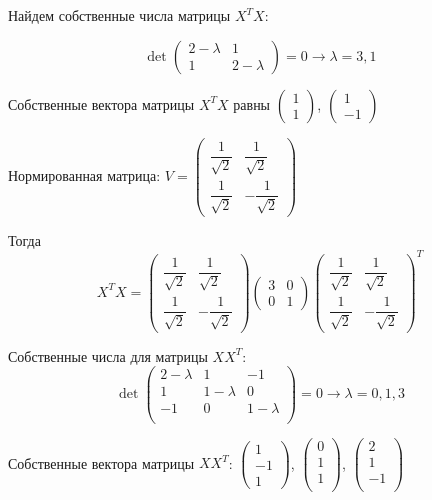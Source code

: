 \documentclass[12pt]{article} %
\theoremstyle{definition} %
\begin{document}
Найдем собственные числа матрицы $X^TX$:

\[
\det \begin{pmatrix}
2-\lambda & 1 \\
1 & 2-\lambda
\end{pmatrix}=0 \rightarrow \lambda = 3,1
\]

Собственные вектора матрицы $X^TX$ равны $\begin{pmatrix}
1 \\
1
\end{pmatrix}$, $\begin{pmatrix}
1 \\
-1
\end{pmatrix}$

Нормированная матрица:
$V = \begin{pmatrix}
\dfrac{1}{\sqrt{2}} & \dfrac{1}{\sqrt{2}} \\
\dfrac{1}{\sqrt{2}} & -\dfrac{1}{\sqrt{2}}
\end{pmatrix} $

Тогда
\[
X^TX = \begin{pmatrix}
\dfrac{1}{\sqrt{2}} & \dfrac{1}{\sqrt{2}} \\
\dfrac{1}{\sqrt{2}} & -\dfrac{1}{\sqrt{2}}
\end{pmatrix}
\begin{pmatrix}
3 & 0 \\
0 & 1
\end{pmatrix}
\begin{pmatrix}
\dfrac{1}{\sqrt{2}} & \dfrac{1}{\sqrt{2}} \\
\dfrac{1}{\sqrt{2}} & -\dfrac{1}{\sqrt{2}}
\end{pmatrix}^T
\]

Собственные числа для матрицы $XX^T$:
\[
\det \begin{pmatrix}
2-\lambda & 1 & -1 \\
1& 1-\lambda & 0 \\
-1 & 0 & 1-\lambda \\
\end{pmatrix}=0 \rightarrow \lambda = 0,1,3
\]

Собственные вектора матрицы $XX^T$: $\begin{pmatrix}
1 \\
-1 \\
1
\end{pmatrix}$, $\begin{pmatrix}
0 \\
1\\
1\\
\end{pmatrix}$,
$\begin{pmatrix}
2 \\
1\\
-1\\
\end{pmatrix}$
\end{document}
